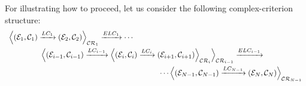 \documentclass[a4paper,11pt] {ivoa}
\begin{document}
For illustrating how to proceed, let us consider the following complex-criterion structure:
\begin{equation}\label{eq-CriterionStructure03}
\begin{array}{l}
\displaystyle \Big \langle (\mathcal E_1, \mathcal C_1) \xrightarrow{LC_1} 
(\mathcal E_2, \mathcal C_2) \Big \rangle_{\mathcal{CR}_1 } \xrightarrow{ELC_1} 
\cdots \vspace{1mm}
\\
\hspace{1.5cm} \displaystyle \Big \langle (\mathcal E_{i-1}, \mathcal C_{i-1}) \xrightarrow{LC_{i-1}}
\Big \langle
(\mathcal E_i, \mathcal C_i) \xrightarrow{LC_i}
(\mathcal E_{i+1}, \mathcal C_{i+1}) \Big\rangle_{\mathcal{CR}_{i} }  \Big \rangle_{\mathcal{CR}_{i-1}}  \xrightarrow{ELC_{i-1}}  \vspace{1mm} \\
 \hspace{7cm} \cdots \displaystyle \Big \langle (\mathcal E_{N-1}, \mathcal C_{N-1}) \xrightarrow{LC_{N-1}}
(\mathcal E_N, \mathcal C_N) \Big\rangle_{\mathcal{CR}_{N-1} } \\
\end{array}
\end{equation}
\end{document}
